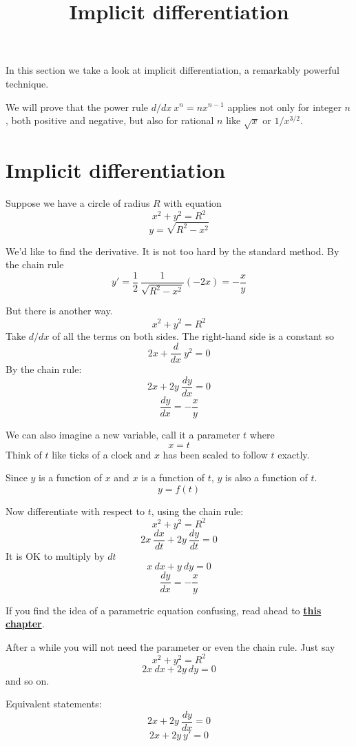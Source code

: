 \documentclass[11pt, oneside]{article}
\title{Implicit differentiation}
\date{}
\begin{document}
\maketitle
\Large

\label{sec:Techniques_of_differentiation}

\label{sec:Implicit_differentiation}

In this section we take a look at implicit differentiation, a remarkably powerful technique.

We will prove that the power rule $d/dx \ x^n = n x^{n-1}$ applies not only for integer $n$, both positive and negative, but also for rational $n$ like $\sqrt{x}$ or $1/x^{3/2}$.

\section*{Implicit differentiation}
Suppose we have a circle of radius $R$ with equation
\[ x^2 + y^2 = R^2 \]
\[ y = \sqrt{R^2 - x^2} \]

We'd like to find the derivative.  It is not too hard by the standard method.  By the chain rule
\[ y' = \frac{1}{2} \ \frac{1}{\sqrt{R^2 - x^2}} (-2x) = -\frac{x}{y} \]

But there is another way.  
\[ x^2 + y^2 = R^2 \]
Take $d/dx$ of all the terms on both sides.  The right-hand side is a constant so
\[ 2x + \frac{d}{dx} \ y^2 = 0 \]
By the chain rule:
\[ 2x + 2y \ \frac{dy}{dx} = 0 \]
\[ \frac{dy}{dx} = - \frac{x}{y} \]

We can also imagine a new variable, call it a parameter $t$ where 
\[ x = t \]
Think of $t$ like ticks of a clock and $x$ has been scaled to follow $t$ exactly.

Since $y$ is a function of $x$ and $x$ is a function of $t$, $y$ is also a function of $t$.
\[ y = f(t) \]

Now differentiate with respect to $t$, using the chain rule:
\[ x^2 + y^2 = R^2 \]
\[ 2x \ \frac{dx}{dt} + 2 y \ \frac{dy}{dt} = 0 \]
It is OK to multiply by $dt$
\[ x \ dx + y \ dy = 0 \]
\[ \frac{dy}{dx} = -\frac{x}{y} \]

If you find the idea of a parametric equation confusing, read ahead to \hyperref[sec:Parametric_equations]{\textbf{this chapter}}.

After a while you will not need the parameter or even the chain rule.  Just say
\[ x^2 + y^2 = R^2 \]
\[ 2x \ dx + 2y \ dy = 0 \]
and so on.

Equivalent statements:
\[ 2x + 2y \ \frac{dy}{dx} = 0 \]
\[ 2x + 2y \ y' = 0 \]
\end{document}
